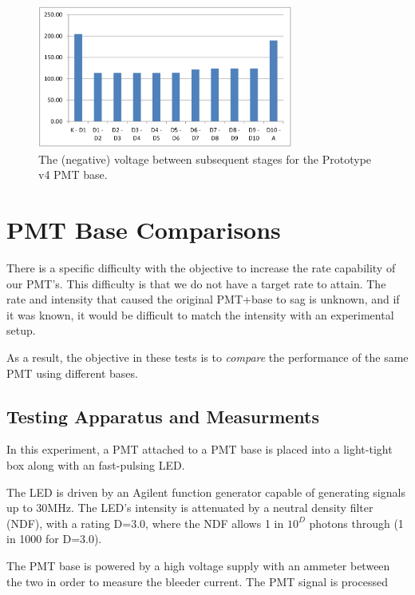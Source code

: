\documentclass[11pt]{article}
\begin{document}
\begin{figure}[h]
    \centerline{
    \mbox{\includegraphics[width=0.75\textwidth]{v4-volt.jpg}}
    }
    \caption{The (negative) voltage between subsequent stages for the Prototype v4 PMT base.}
    \label{fig:v4-volt}
\end{figure}
\newpage

\section{PMT Base Comparisons}

There is a specific difficulty with the objective to increase the rate capability of our PMT's. This difficulty is that we do not have a target rate to attain. The rate and intensity that caused the original PMT+base to sag is unknown, and if it was known, it would be difficult to match the intensity with an experimental setup.

As a result, the objective in these tests is to \emph{compare} the performance of the same PMT using different bases.

\subsection{Testing Apparatus and Measurments}

In this experiment, a PMT attached to a PMT base is placed into a light-tight box along with an fast-pulsing LED. 

The LED is driven by an Agilent function generator capable of generating signals up to 30MHz. The LED's intensity is attenuated by a neutral density filter (NDF), with a rating D=3.0, where the NDF allows 1 in $10^D$ photons through (1 in 1000 for D=3.0).

The PMT base is powered by a high voltage supply with an ammeter between the two in order to measure the bleeder current. The PMT signal is processed 
\end{document}
